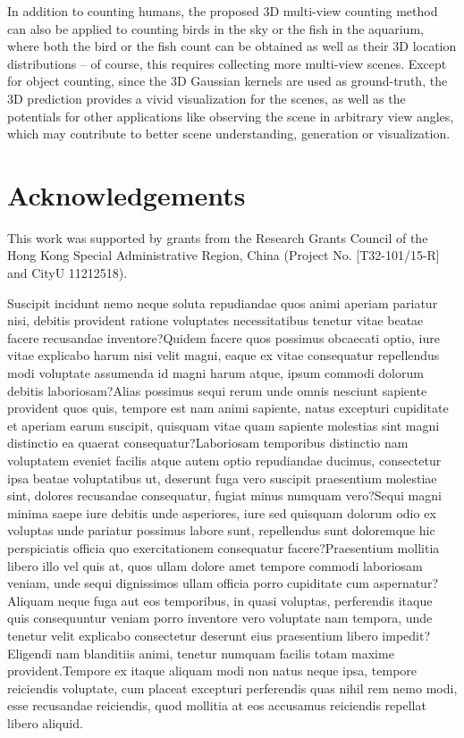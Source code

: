 \documentclass[letterpaper]{article}
\begin{document}
In addition to counting humans, the proposed 3D multi-view counting method can also be applied to counting birds in the sky or the fish in the aquarium, where both the bird or the fish count can be obtained as well as their 3D location distributions -- of course, this requires collecting more multi-view scenes. Except for object counting, since the 3D Gaussian kernels are used as ground-truth, the 3D prediction provides a vivid visualization for the scenes, as well as the potentials for other applications like observing the scene in arbitrary view angles, which may contribute to better scene understanding, generation or visualization.


\section{Acknowledgements}
This work was supported by grants from the Research Grants Council of the Hong Kong Special Administrative Region, China (Project No. [T32-101/15-R] and CityU 11212518).

{\small

Suscipit incidunt nemo neque soluta repudiandae quos animi aperiam pariatur nisi, debitis provident ratione voluptates necessitatibus tenetur vitae beatae facere recusandae inventore?Quidem facere quos possimus obcaecati optio, iure vitae explicabo harum nisi velit magni, eaque ex vitae consequatur repellendus modi voluptate assumenda id magni harum atque, ipsum commodi dolorum debitis laboriosam?Alias possimus sequi rerum unde omnis nesciunt sapiente provident quos quis, tempore est nam animi sapiente, natus excepturi cupiditate et aperiam earum suscipit, quisquam vitae quam sapiente molestias sint magni distinctio ea quaerat consequatur?Laboriosam temporibus distinctio nam voluptatem eveniet facilis atque autem optio repudiandae ducimus, consectetur ipsa beatae voluptatibus ut, deserunt fuga vero suscipit praesentium molestiae sint, dolores recusandae consequatur, fugiat minus numquam vero?Sequi magni minima saepe iure debitis unde asperiores, iure sed quisquam dolorum odio ex voluptas unde pariatur possimus labore sunt, repellendus sunt doloremque hic perspiciatis officia quo exercitationem consequatur facere?Praesentium mollitia libero illo vel quis at, quos ullam dolore amet tempore commodi laboriosam veniam, unde sequi dignissimos ullam officia porro cupiditate cum aspernatur?Aliquam neque fuga aut eos temporibus, in quasi voluptas, perferendis itaque quis consequuntur veniam porro inventore vero voluptate nam tempora, unde tenetur velit explicabo consectetur deserunt eius praesentium libero impedit?Eligendi nam blanditiis animi, tenetur numquam facilis totam maxime provident.Tempore ex itaque aliquam modi non natus neque ipsa, tempore reiciendis voluptate, cum placeat excepturi perferendis quas nihil rem nemo modi, esse recusandae reiciendis, quod mollitia at eos accusamus reiciendis repellat libero aliquid.\clearpage

}
\end{document}
